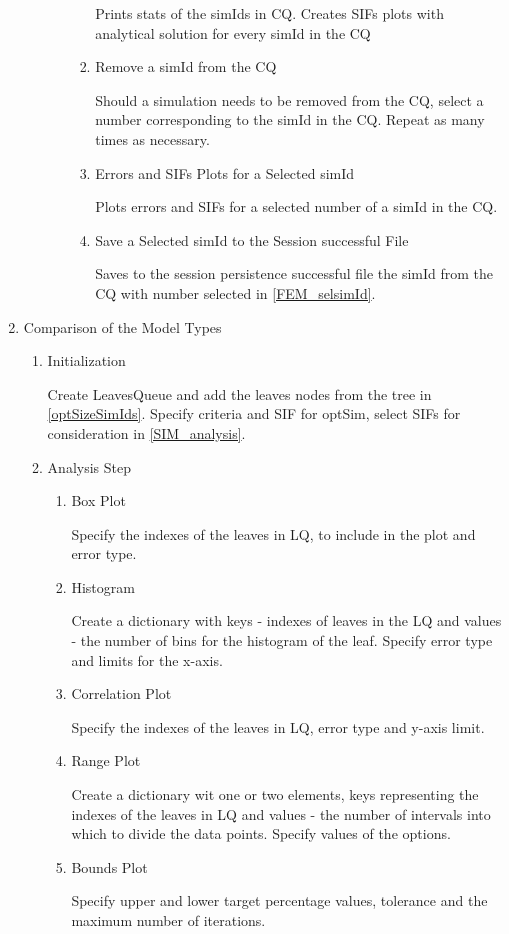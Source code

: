 \documentclass[10pt,a4paper]{article}
\begin{document}
\begin{enumerate}
\begin{enumerate}
\begin{enumerate}
\begin{enumerate}
Prints stats of the simIds in CQ. Creates SIFs plots with analytical solution for every simId in the CQ
\item Remove a simId from the CQ

Should a simulation needs to be removed from the CQ, select a number corresponding to the simId in the CQ. Repeat as many times as necessary.
\item Errors and SIFs Plots for a Selected simId\label{FEM_selsimId}

Plots errors and SIFs for a selected number of a simId in the CQ.
\item Save a Selected simId to the Session successful File

Saves to the session persistence successful file the simId from the CQ with number selected in \ref{FEM_selsimId}.
\end{enumerate}
\end{enumerate}
\end{enumerate}

\item Comparison of the Model Types
\begin{enumerate}
\item Initialization

Create LeavesQueue and add the leaves nodes from the tree in \ref{optSizeSimIds}. Specify criteria and SIF for optSim, select SIFs for consideration in \ref{SIM_analysis}.
\item Analysis Step\label{SIM_analysis}
\begin{enumerate}
\item Box Plot

Specify the indexes of the leaves in LQ, to include in the plot and error type.
\item Histogram

Create a dictionary with keys - indexes of leaves in the LQ and values - the number of bins for the histogram of the leaf. Specify error type and limits for the x-axis.
\item Correlation Plot

Specify the indexes of the leaves in LQ, error type and y-axis limit.
\item Range Plot

Create a dictionary wit one or two elements, keys representing the indexes of the leaves in LQ and values - the number of intervals into which to divide the data points. Specify values of the options.
\item Bounds Plot

Specify upper and lower target percentage values, tolerance and the maximum number of iterations.
\end{enumerate}
\end{enumerate}
\end{enumerate}
\end{document}

